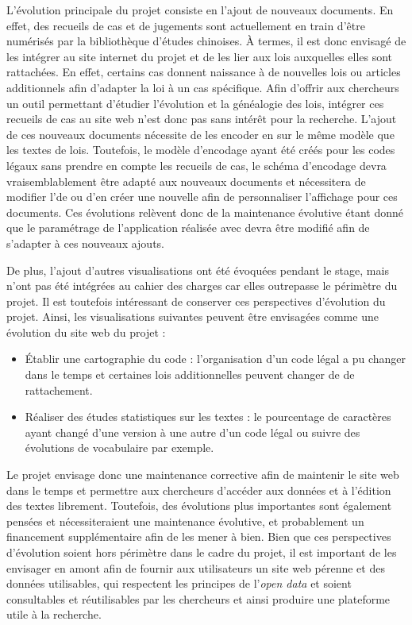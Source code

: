 L'évolution principale du projet \COREL consiste en l'ajout de nouveaux documents. En effet, des recueils de cas et de jugements sont actuellement en train d'être numérisés par la bibliothèque d'études chinoises. À termes, il est donc envisagé de les intégrer au site internet du projet et de les lier aux lois auxquelles elles sont rattachées. En effet, certains cas donnent naissance à de nouvelles lois ou articles additionnels afin d'adapter la loi à un cas spécifique. Afin d'offrir aux chercheurs un outil permettant d'étudier l'évolution et la généalogie des lois, intégrer ces recueils de cas au site web n'est donc pas sans intérêt pour la recherche. L'ajout de ces nouveaux documents nécessite de les encoder en \TEI sur le même modèle que les textes de lois. Toutefois, le modèle d'encodage ayant été créés pour les codes légaux sans prendre en compte les recueils de cas, le schéma d'encodage devra vraisemblablement être adapté aux nouveaux documents et nécessitera de modifier l'\ODD de \tp ou d'en créer une nouvelle afin de personnaliser l'affichage pour ces documents. Ces évolutions relèvent donc de la maintenance évolutive étant donné que le paramétrage de l'application réalisée avec \tp devra être modifié afin de s'adapter à ces nouveaux ajouts. 

De plus, l'ajout d'autres visualisations ont été évoquées pendant le stage, mais n'ont pas été intégrées au cahier des charges car elles outrepasse le périmètre du projet. Il est toutefois intéressant de conserver ces perspectives d'évolution du projet. Ainsi, les visualisations suivantes peuvent être envisagées comme une évolution du site web du projet : 

\begin{itemize}
    \item Établir une cartographie du code : l'organisation d'un code légal a pu changer dans le temps et certaines lois additionnelles peuvent changer de \lu de rattachement. 
    \item Réaliser des études statistiques sur les textes : le pourcentage de caractères ayant changé d'une version à une autre d'un code légal ou suivre des évolutions de vocabulaire par exemple.
\end{itemize}

Le projet \COREL envisage donc une maintenance corrective afin de maintenir le site web dans le temps et permettre aux chercheurs d'accéder aux données et à l'édition des textes librement. Toutefois, des évolutions plus importantes sont également pensées et nécessiteraient une maintenance évolutive, et probablement un financement supplémentaire afin de les mener à bien. Bien que ces perspectives d'évolution soient hors périmètre dans le cadre du projet, il est important de les envisager en amont afin de fournir aux utilisateurs un site web pérenne et des données utilisables, qui respectent les principes de l'\textit{open data} et soient consultables et réutilisables par les chercheurs et ainsi produire une plateforme utile à la recherche. 

